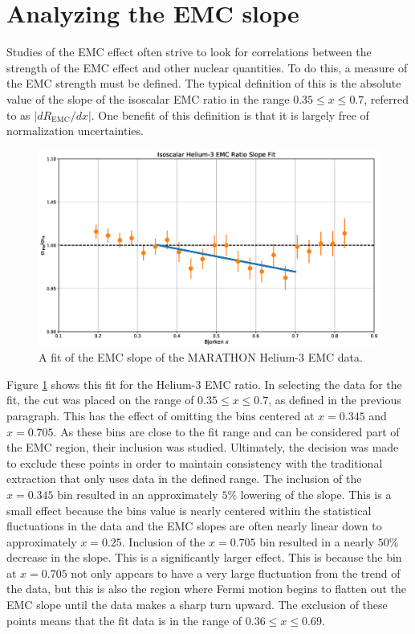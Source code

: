 \section{Analyzing the EMC slope}

Studies of the EMC effect often strive to look for correlations between the strength of the EMC effect and other nuclear quantities. To do this, a measure of the EMC strength must be defined. The typical definition of this is the absolute value of the slope of the isoscalar EMC ratio in the range $0.35 \leq x \leq 0.7$, referred to as $\left|dR_{\text{EMC}}/dx\right|$. One benefit of this definition is that it is largely free of normalization uncertainties. 

\begin{figure}[p]
	\includegraphics[width=\textwidth]{./results/fig/slope_fit.eps}
	\caption{A fit of the EMC slope of the MARATHON Helium-3 EMC data.}
	\label{fig:slope_fit}
\end{figure}

Figure \ref{fig:slope_fit} shows this fit for the Helium-3 EMC ratio. In selecting the data for the fit, the cut was placed on the range of $0.35 \leq x \leq 0.7$, as defined in the previous paragraph. This has the effect of omitting the bins centered at $x=0.345$ and $x=0.705$. As these bins are close to the fit range and can be considered part of the EMC region, their inclusion was studied. Ultimately, the decision was made to exclude these points in order to maintain consistency with the traditional extraction that only uses data in the defined range. The inclusion of the $x=0.345$ bin resulted in an approximately $5\%$ lowering of the slope. This is a small effect because the bins value is nearly centered within the statistical fluctuations in the data and the EMC slopes are often nearly linear down to approximately $x=0.25$. Inclusion of the $x=0.705$ bin resulted in a nearly $50\%$ decrease in the slope. This is a significantly larger effect. This is because the bin at $x=0.705$ not only appears to have a very large fluctuation from the trend of the data, but this is also the region where Fermi motion begins to flatten out the EMC slope until the data makes a sharp turn upward. The exclusion of these points means that the fit data is in the range of $0.36 \leq x \leq 0.69$.

